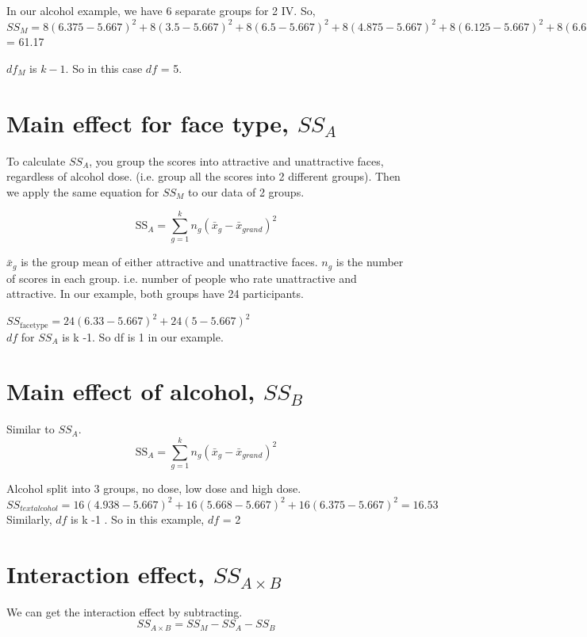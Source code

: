 In our alcohol example, we have 6 separate groups for 2 IV. So, \\

 $SS_M = 8(6.375-5.667)^2 + 8(3.5-5.667)^2 + 8(6.5-5.667)^2 + 8(4.875-5.667)^2 + 8(6.125-5.667)^2 + 8(6.625-5.667)^2$ = 61.17

$df_M$ is $k-1$. So in this case $df$ = 5.

\section{Main effect for face type, $SS_A$}
To calculate $SS_A$, you group the scores into attractive and unattractive faces, regardless of alcohol dose. (i.e. group all the scores into 2 different groups). Then we apply the same equation for $SS_M$ to our data of 2 groups.

\begin{equation}
\text{SS}_A = \sum^k_{g=1} n_g(\bar{x}_g - \bar{x}_{grand})^2
\end{equation}

$\bar{x}_g$ is the group mean of either attractive and unattractive faces. $n_g$ is the number of scores in each group. i.e. number of people who rate unattractive and attractive. In our example, both groups have 24 participants.

$SS_{\text{facetype}} = 24(6.33-5.667)^2 + 24(5-5.667)^2$ \\

$df$ for $SS_A$ is k -1. So df is 1 in our example. 

\section{Main effect of alcohol, $SS_B$}
Similar to $SS_A$.
\begin{equation}
\text{SS}_A = \sum^k_{g=1} n_g(\bar{x}_g - \bar{x}_{grand})^2
\end{equation}

Alcohol split into 3 groups, no dose, low dose and high dose. \\
$SS_{text{alcohol}} = 16(4.938-5.667)^2+ 16(5.668-5.667)^2 + 16(6.375-5.667)^2 = 16.53 $\\

Similarly, $df$ is k -1 . So in this example, $df$ = 2

\section{Interaction effect, $SS_{A \times B}$}
We can get the interaction effect by subtracting. 
\begin{equation}
SS_{A \times B} = SS_M - SS_A - SS_B
\end{equation}

